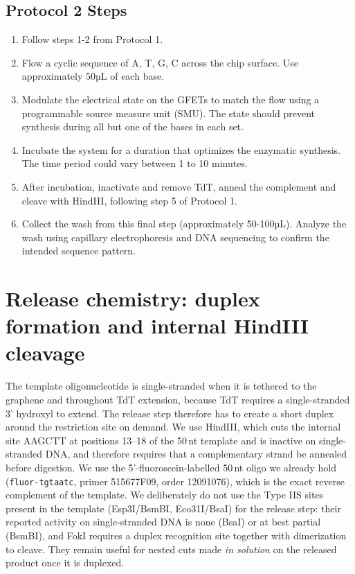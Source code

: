 \documentclass[11pt]{article}
\begin{document}
\subsection*{Protocol 2 Steps}
\begin{enumerate}
    \item Follow steps 1-2 from Protocol 1.
    \item Flow a cyclic sequence of A, T, G, C across the chip surface. Use approximately 50µL of each base.
    \item Modulate the electrical state on the GFETs to match the flow using a programmable source measure unit (SMU). The state should prevent synthesis during all but one of the bases in each set.
    \item Incubate the system for a duration that optimizes the enzymatic synthesis. The time period could vary between 1 to 10 minutes.
    \item After incubation, inactivate and remove TdT, anneal the complement and cleave with HindIII, following step 5 of Protocol 1.
    \item Collect the wash from this final step (approximately 50-100µL). Analyze the wash using capillary electrophoresis and DNA sequencing to confirm the intended sequence pattern.
\end{enumerate}

\section*{Release chemistry: duplex formation and internal HindIII cleavage}

The template oligonucleotide is single-stranded when it is tethered to the graphene and throughout TdT extension, because TdT requires a single-stranded 3' hydroxyl to extend.
The release step therefore has to create a short duplex around the restriction site on demand.
We use HindIII, which cuts the internal site AAGCTT at positions 13--18 of the 50\,nt template and is inactive on single-stranded DNA, and therefore requires that a complementary strand be annealed before digestion.
We use the 5'-fluoroscein-labelled 50\,nt oligo we already hold (\texttt{fluor-tgtaatc}, primer 515677F09, order 12091076), which is the exact reverse complement of the template.
We deliberately do not use the Type IIS sites present in the template (Esp3I/BsmBI, Eco31I/BsaI) for the release step: their reported activity on single-stranded DNA is none (BsaI) or at best partial (BsmBI), and FokI requires a duplex recognition site together with dimerization to cleave.
They remain useful for nested cuts made \emph{in solution} on the released product once it is duplexed.
\end{document}
